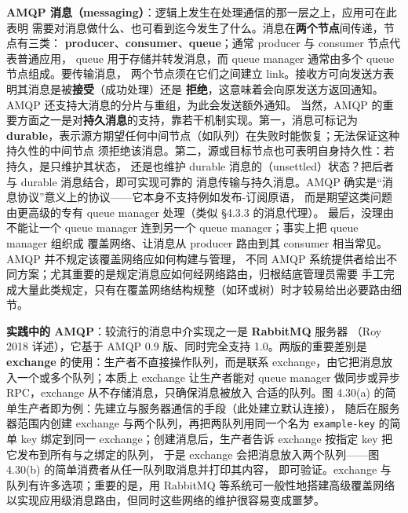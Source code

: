 \medskip\noindent\textbf{AMQP 消息（messaging）}：逻辑上发生在处理通信的那一层之上，应用可在此表明
需要对消息做什么、也可看到迄今发生了什么。消息在\textbf{两个节点}间传递，节点有三类：
\textbf{producer}、\textbf{consumer}、\textbf{queue}；通常 producer 与 consumer 节点代表普通应用，
queue 用于存储并转发消息，而 queue manager 通常由多个 queue 节点组成。要传输消息，
两个节点须在它们之间建立 link。接收方可向发送方表明其消息是被\textbf{接受}（成功处理）还是
\textbf{拒绝}，这意味着会向原发送方返回通知。AMQP 还支持大消息的分片与重组，为此会发送额外通知。
当然，AMQP 的重要方面之一是对\textbf{持久消息}的支持，靠若干机制实现。第一，消息可标记为
\textbf{durable}，表示源方期望任何中间节点（如队列）在失败时能恢复；无法保证这种持久性的中间节点
须拒绝该消息。第二，源或目标节点也可表明自身持久性：若持久，是只维护其状态，
还是也维护 durable 消息的（unsettled）状态？把后者与 durable 消息结合，即可实现可靠的
消息传输与持久消息。AMQP 确实是“消息协议”意义上的协议——它本身不支持例如发布-订阅原语，
而是期望这类问题由更高级的专有 queue manager 处理（类似 §4.3.3 的消息代理）。
最后，没理由不能让一个 queue manager 连到另一个 queue manager；事实上把 queue manager 组织成
覆盖网络、让消息从 producer 路由到其 consumer 相当常见。AMQP 并不规定该覆盖网络应如何构建与管理，
不同 AMQP 系统提供者给出不同方案；尤其重要的是规定消息应如何经网络路由，归根结底管理员需要
手工完成大量此类规定，只有在覆盖网络结构规整（如环或树）时才较易给出必要路由细节。

\medskip\noindent\textbf{实践中的 AMQP}：较流行的消息中介实现之一是 \textbf{RabbitMQ} 服务器
（Roy 2018 详述），它基于 AMQP 0.9 版、同时完全支持 1.0。两版的重要差别是 \textbf{exchange}
的使用：生产者不直接操作队列，而是联系 exchange，由它把消息放入一个或多个队列；本质上
exchange 让生产者能对 queue manager 做同步或异步 RPC，exchange 从不存储消息，只确保消息被放入
合适的队列。图 4.30(a) 的简单生产者即为例：先建立与服务器通信的手段（此处建立默认连接），
随后在服务器范围内创建 exchange 与两个队列，再把两队列用同一个名为 \texttt{example-key} 的简单
key 绑定到同一 exchange；创建消息后，生产者告诉 exchange 按指定 key 把它发布到所有与之绑定的队列，
于是 exchange 会把消息放入两个队列——图 4.30(b) 的简单消费者从任一队列取消息并打印其内容，
即可验证。exchange 与队列有许多选项；重要的是，用 RabbitMQ 等系统可一般性地搭建高级覆盖网络
以实现应用级消息路由，但同时这些网络的维护很容易变成噩梦。

\begin{closeread}
\end{closeread}

